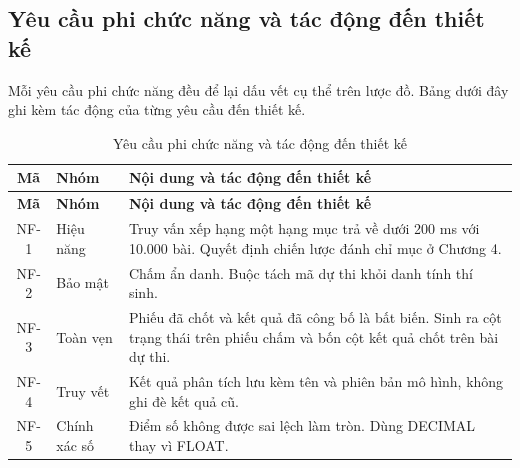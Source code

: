 \subsection{Yêu cầu phi chức năng và tác động đến thiết kế}

Mỗi yêu cầu phi chức năng đều để lại dấu vết cụ thể trên lược đồ. Bảng dưới đây ghi kèm tác động của từng yêu cầu đến thiết kế.


\begin{longtable}{|c|p{2.4cm}|p{8.8cm}|}
\caption{Yêu cầu phi chức năng và tác động đến thiết kế} \\
\hline
\textbf{Mã} & \textbf{Nhóm} & \textbf{Nội dung và tác động đến thiết kế} \\ \hline
\endfirsthead
\hline
\textbf{Mã} & \textbf{Nhóm} & \textbf{Nội dung và tác động đến thiết kế} \\ \hline
\endhead
NF-1 & Hiệu năng & Truy vấn xếp hạng một hạng mục trả về dưới 200 ms với 10.000 bài. Quyết định chiến lược đánh chỉ mục ở Chương 4. \\ \hline
NF-2 & Bảo mật & Chấm ẩn danh. Buộc tách mã dự thi khỏi danh tính thí sinh. \\ \hline
NF-3 & Toàn vẹn & Phiếu đã chốt và kết quả đã công bố là bất biến. Sinh ra cột trạng thái trên phiếu chấm và bốn cột kết quả chốt trên bài dự thi. \\ \hline
NF-4 & Truy vết & Kết quả phân tích lưu kèm tên và phiên bản mô hình, không ghi đè kết quả cũ. \\ \hline
NF-5 & Chính xác số & Điểm số không được sai lệch làm tròn. Dùng DECIMAL thay vì FLOAT. \\ \hline
\end{longtable}



